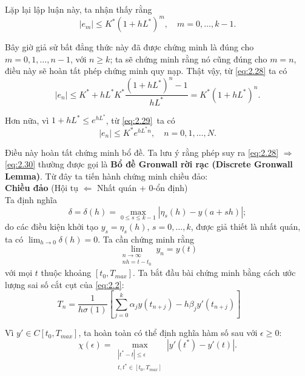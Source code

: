 Lặp lại lập luận này, ta nhận thấy rằng
\begin{equation*}
    |e_m| \le K^*(1 + h L^*)^m, \quad m = 0, \dots, k - 1 .
\end{equation*}

Bây giờ giả sử bất đẳng thức này đã được chứng minh là đúng cho $m = 0, 1, \dots, n - 1$, với $n \ge k$; ta sẽ chứng minh rằng nó cũng đúng cho $m = n$, điều này sẽ hoàn tất phép chứng minh quy nạp. Thật vậy, từ \eqref{eq:2.28} ta có
\begin{equation}
    |e_n| \le K^* + h L^* K^* \frac{(1 + h L^*)^n - 1}{h L^*} = K^*(1 + h L^*)^n . \tag{2.29} \label{eq:2.29}
\end{equation}

Hơn nữa, vì $1 + h L^* \le e^{h L^*}$, từ \eqref{eq:2.29}\ ta có
\begin{equation}
    |e_n| \le K^* e^{h L^* n}, \quad n = 0, 1, \dots, N . \tag{2.30} \label{eq:2.30}
\end{equation}

Điều này hoàn tất chứng minh bổ đề. Ta lưu ý rằng phép suy ra \eqref{eq:2.28} $\Rightarrow$ \eqref{eq:2.30} thường được gọi là \textbf{Bổ đề Gronwall rời rạc (Discrete Gronwall Lemma)}. Từ đây ta tiến hành chứng minh chiều đảo:\\

\noindent\textbf{Chiều đảo} (Hội tụ $\Longleftarrow$ Nhất quán + $0$-ổn định)\\

Ta định nghĩa
\begin{equation*}
    \delta = \delta(h) = \max_{0 \le s \le k-1} |\eta_s(h) - y(a + sh)| ;
\end{equation*}
do các điều kiện khởi tạo $y_s = \eta_s(h)$, $s = 0, \dots, k$, được giả thiết là nhất quán, ta có $\displaystyle\lim_{h \to 0} \delta(h) = 0$. Ta cần chứng minh rằng
\begin{equation*}
    \lim_{\substack{n \to \infty \\ nh = t - t_0}} y_n = y(t)
\end{equation*}
với mọi $t$ thuộc khoảng $[t_0, T_{max}]$. Ta bắt đầu bài chứng minh bằng cách ước lượng sai số cắt cụt của \eqref{eq:2.2}:
\begin{equation}
    T_n = \frac{1}{h\sigma(1)} \left[ \sum_{j=0}^k \alpha_j y(t_{n+j}) - h \beta_j y'(t_{n+j}) \right] \qquad \tag{2.31} \label{eq:2.31}
\end{equation}

Vì $y' \in C[t_0, T_{max}]$, ta hoàn toàn có thể định nghĩa hàm số sau với $\epsilon \ge 0$:
\begin{equation*}
    \chi(\epsilon) = \max_{\substack{|t^* - t| \le \epsilon \\ t, t^* \in [t_0, T_{max}]}} |y'(t^*) - y'(t)| .
\end{equation*}

